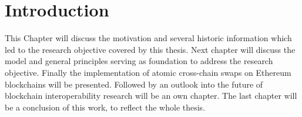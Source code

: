 %
%
\chapter{Introduction}
\label{ch:intro}
This Chapter will discuss the motivation and several historic information which led to the research objective covered by this thesis. Next chapter will discuss the model and general principles serving as foundation to address the research objective. Finally the implementation of atomic cross-chain swaps on Ethereum blockchains will be presented. Followed by an outlook into the future of blockchain interoperability research will be an own chapter.
The last chapter will be a conclusion of this work, to reflect the whole thesis.

%
%
